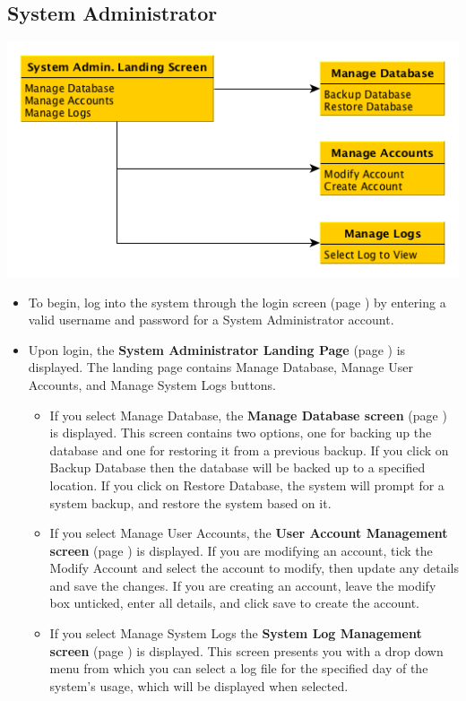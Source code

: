 \documentclass{article}
\begin{document}
\subsection{System Administrator}
\centerline{\includegraphics[scale=0.6]{../images/UIMockups/pngs/sysAdmin}}
\begin{itemize}
  \item To begin, log into the system through the login screen (page \pageref{login})
    by entering a valid username and password for a System Administrator account.
  \item Upon login, the \textbf{System Administrator Landing Page} (page 
    \pageref{landPg}) is displayed. The landing page contains Manage Database, 
    Manage User Accounts, and Manage System Logs buttons.
    \begin{itemize}
      \item If you select Manage Database, the \textbf{Manage Database screen} 
	(page \pageref{manageDB}) is displayed. This screen contains two 
	options, one for backing up the database and one for restoring it from 
	a previous backup. If you click on Backup Database then the database
	will be backed up to a specified location. If you click on Restore 
	Database, the system will prompt for a system backup, and restore
	the system based on it.
      \item If you select Manage User Accounts, the \textbf{User Account 
	Management screen} (page \pageref{manageAccts}) is displayed. If you are
	modifying an account, tick the Modify Account and select the account to
	modify, then update any details and save the changes. If you are creating an
	account, leave the modify box unticked, enter all details, and click save to
	create the account.
      \item If you select Manage System Logs the \textbf{System Log Management 
	screen} (page \pageref{manageLogs}) is displayed. This screen presents 
	you with a drop down menu from which you can select a log file for the 
	specified day of the system's usage, which will be displayed when selected.
    \end{itemize}
\end{itemize}
\end{document}
